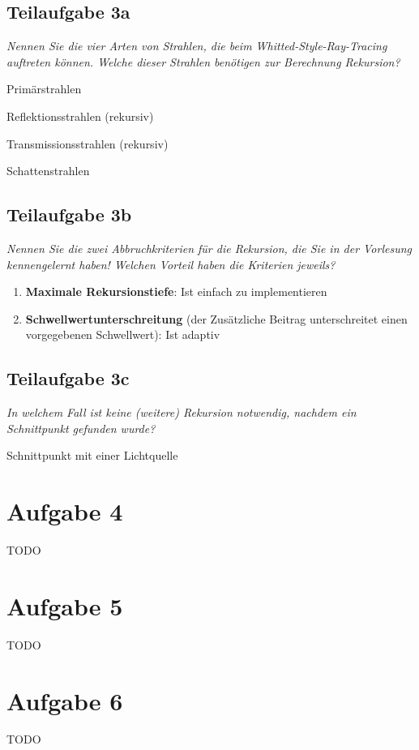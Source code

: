\documentclass[a4paper]{scrartcl}
\begin{document}
\subsection*{Teilaufgabe 3a}
\textit{Nennen Sie die vier Arten von Strahlen, die beim
Whitted-Style-Ray-Tracing auftreten können. Welche dieser Strahlen benötigen
zur Berechnung Rekursion?}

\begin{enumerate*}[label=(\arabic*)]
    \item Primärstrahlen
    \item Reflektionsstrahlen (rekursiv)
    \item Transmissionsstrahlen (rekursiv)
    \item Schattenstrahlen
\end{enumerate*}

\clearpage
\subsection*{Teilaufgabe 3b}
\textit{Nennen Sie die zwei Abbruchkriterien für die Rekursion, die Sie in der
Vorlesung kennengelernt haben! Welchen Vorteil haben die Kriterien jeweils?}
\begin{enumerate}[label=(\arabic*)]
    \item \textbf{Maximale Rekursionstiefe}: Ist einfach zu implementieren
    \item \textbf{Schwellwertunterschreitung} (der Zusätzliche Beitrag
    unterschreitet einen vorgegebenen Schwellwert): Ist adaptiv
\end{enumerate}

\subsection*{Teilaufgabe 3c}
\textit{In welchem Fall ist keine (weitere) Rekursion notwendig, nachdem ein
Schnittpunkt gefunden wurde?}

Schnittpunkt mit einer Lichtquelle


\section*{Aufgabe 4}
TODO

\section*{Aufgabe 5}
TODO

\section*{Aufgabe 6}
TODO
\end{document}
